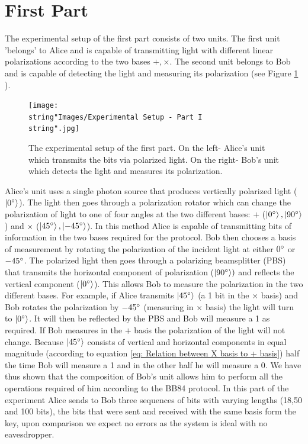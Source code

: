 \documentclass[reprint,amsmath,amssymb,aps, prl,superscriptaddress]{revtex4-2}
\begin{document}
\section*{First Part}
The experimental setup of the first part consists of two units. The first unit 'belongs' to Alice and is capable of transmitting light with different linear polarizations according to the two bases $+,\times$. The second unit belongs to Bob and is capable of detecting the light and measuring its polarization (see Figure \ref{fig: Experimental Setup - Part 1} ). 
\begin{figure}[H]
\texttt{[image: \\string"Images/Experimental Setup - Part I\\string".jpg]}

\caption{The experimental setup of the first part. On the left- Alice's unit
which transmits the bits via polarized light. On the right- Bob's
unit which detects the light and measures its polarization. \label{fig: Experimental Setup - Part 1}}

\end{figure}
Alice's unit uses a single photon source  that produces vertically polarized light ($\ket{0^{\circ}}$). The light then goes through a polarization rotator which can change the polarization of light to one of four angles at the two different bases: $+$ ($\ket{0^{\circ}},\ket{90^{\circ}}$) and $\times$ ($\ket{45^{\circ}},\ket{-45^{\circ}}$). In this method Alice is capable of transmitting bits of information in the two bases required for the protocol. Bob then chooses a basis of measurement by rotating the polarization of the incident light at either $0^{\circ}$ or $-45^{\circ}$. The polarized light then goes through a polarizing beamsplitter (PBS) that transmits the horizontal component of polarization ($\ket{90^{\circ}})$ and reflects the vertical component ($\ket{0^{\circ}}$). This  allows Bob to measure the polarization in the two different bases. For example, if Alice transmits $\ket{45^{\circ}}$ (a 1 bit in the $\times$ basis) and Bob rotates the polarization by $-45^{\circ}$  (measuring in $\times$ basis) the light will turn to $\ket{0^{\circ}}$. It will then be reflected by the PBS and Bob will measure a 1 as required. If Bob measures in the $+$ basis the polarization of the light will not change. Because $\ket{45^{\circ}}$ consists of vertical and horizontal components in equal magnitude (according to equation \ref{eq: Relation between X basis to + basis}) half the time Bob will measure a 1 and in the other half he will measure a 0. We have thus shown that the composition of Bob's unit allows him to perform all the operations required of him according to the BB84 protocol. In this part of the experiment Alice sends to Bob three sequences of bits with varying lengths (18,50 and 100 bits), the bits that were sent and received with the same basis form the key, upon comparison we expect no errors as the system is ideal with no eavesdropper.
\end{document}
